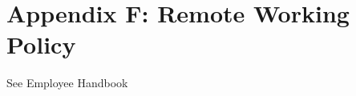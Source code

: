 \documentclass[../main.tex]{subfiles}
\begin{document}
\section{Appendix F: Remote Working Policy}
See Employee Handbook
\end{document}
